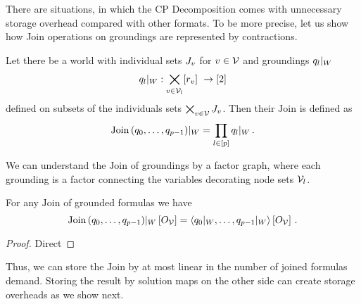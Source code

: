 There are situations, in which the CP Decomposition comes with unnecessary storage overhead compared with other formats.
To be more precise, let us show how Join operations on groundings are represented by contractions.

\begin{definition}
	Let there be a world with individual sets $J_v$ for $v\in\mathcal{V}$ and groundings ${q_{l}}|_{W}$ 
		\[ \groundingof{\extformulaof{l}}: \bigtimes_{\node\in\nodes_l} [\inddimof{\node}] \rightarrow [2] \]
	defined on subsets of the individuals sets $\bigtimes_{v\in\mathcal{V}}J_v$.
	Then their $\mathrm{Join}$ is defined as
		\[ {\mathrm{Join}\left(q_{0},\ldots,q_{p-1} \right)}|_{W} = \prod_{l\in[p]} {q_{l}}|_{W} \, .\]
\end{definition}

We can understand the $\mathrm{Join}$ of groundings by a factor graph, where each grounding is a factor connecting the variables decorating node sets $\mathcal{V}_l$.


\begin{theorem}
	For any $\mathrm{Join}$ of grounded formulas we have
		\[ {\mathrm{Join}\left(q_{0},\ldots,q_{p-1} \right)}|_{W} \left[O_{\mathcal{V}}\right] = 
		\left\langle {q_{0}}|_{W},\ldots,{q_{p-1}}|_{W}\right\rangle \left[ O_{\mathcal{V}} \right] \, . \]
\end{theorem}
\begin{proof}
	Direct
\end{proof}

Thus, we can store the $\mathrm{Join}$ by at most linear in the number of joined formulas demand.
Storing the result by solution maps on the other side can create storage overheads as we show next.


